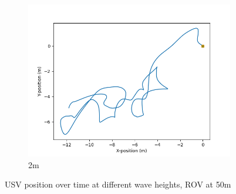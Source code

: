 \documentclass[class=article, crop=false]{standalone}
\begin{document}
\begin{figure}
\begin{subfigure}[b]{0.48\textwidth}
        \includegraphics{scenario1/rov-50m/2.0m/usv_position_controlled}
        \caption{2m}
        \label{}
    \end{subfigure}

    \caption{USV position over time at different wave heights, ROV at 50m}
\end{figure}
\end{document}

